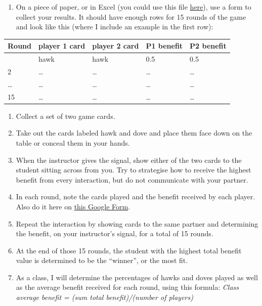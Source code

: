 \documentclass[
  a4paper]{book}
\providecommand{\tightlist}{%
  \setlength{\itemsep}{0pt}\setlength{\parskip}{0pt}}
\begin{document}
\begin{enumerate}
\def\labelenumi{\arabic{enumi}.}
\setcounter{enumi}{-1}
\tightlist
\item
  On a piece of paper, or in Excel (you could use this file \href{https://www.dropbox.com/s/48lypfd6o0hi46e/Table_2_Group_behavior.xlsx?dl=1}{here}), use a form to collect your results. It should have enough rows for 15 rounds of the game and look like this (where I include an example in the first row):
\end{enumerate}

\begin{longtable}[]{@{}lllll@{}}
\toprule\noalign{}
Round & player 1 card & player 2 card & P1 benefit & P2 benefit \\
\midrule\noalign{}
\endhead
\bottomrule\noalign{}
\endlastfoot
1 & hawk & hawk & 0.5 & 0.5 \\
2 & \ldots{} & \ldots{} & \ldots{} & \ldots{} \\
\ldots{} & \ldots{} & \ldots{} & \ldots{} & \ldots{} \\
15 & \ldots{} & \ldots{} & \ldots{} & \ldots{} \\
\end{longtable}

\begin{enumerate}
\def\labelenumi{\arabic{enumi}.}
\item
  Collect a set of two game cards.
\item
  Take out the cards labeled hawk and dove and place them face down on the table or conceal them in your hands.
\item
  When the instructor gives the signal, show either of the two cards to the student sitting across from you. Try to strategise how to receive the highest benefit from every interaction, but do not communicate with your partner.
\item
  In each round, note the cards played and the benefit received by each player. Also do it here on \href{https://forms.gle/3fjBGF7xVAYRQ5hXA}{this Google Form}.
\item
  Repeat the interaction by showing cards to the same partner and determining the benefit, on your instructor's signal, for a total of 15 rounds.
\item
  At the end of those 15 rounds, the student with the highest total benefit value is determined to be the ``winner'', or the most fit.
\item
  As a class, I will determine the percentages of hawks and doves played as well as the average benefit received for each round, using this formula: \emph{Class average benefit = (sum total benefit)/(number of players)}
\end{enumerate}
\end{document}
